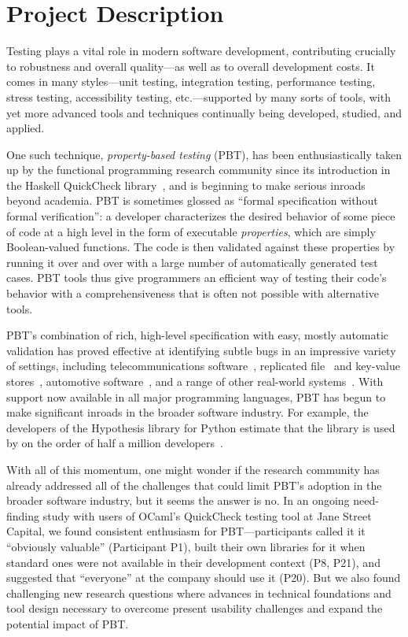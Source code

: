 \section*{Project Description}

Testing plays a vital role in modern software development,
contributing crucially to robustness and overall quality---as well as
to overall development costs.
%
It comes in many styles---unit testing, integration testing,
performance testing, stress testing, accessibility testing,
etc.---supported by many sorts of tools, with yet more advanced tools
and techniques continually being developed, studied, and applied.

One such technique, {\em property-based testing} (PBT), has been
enthusiastically taken up by the functional programming research
community since its introduction in the Haskell QuickCheck
library~\cite{ClaessenHughes00}, and is beginning to make
serious inroads beyond academia.
%
PBT is sometimes glossed as ``formal specification without formal
verification'': a developer characterizes the desired behavior of
some piece of code at a high level in the form of executable {\em
  properties}, which are simply Boolean-valued functions. The code is
then validated against these properties by running it over and over
with a large number of automatically generated test cases.
%
PBT tools thus give programmers an efficient way of testing their
code's behavior with a comprehensiveness that is often not
possible with alternative tools.

PBT's combination of rich, high-level specification with easy, mostly
automatic validation has proved effective at identifying subtle
bugs in an impressive variety of settings, including telecommunications
software~\cite{arts2006testing}, replicated
file~\cite{hughes2014mysteries} and key-value
stores~\cite{Bornholt2021}, automotive software~\cite{arts2015testing}, and a range
of other real-world systems~\cite{hughes2016experiences}. With support
now available in all major programming languages, PBT has
begun to make significant inroads in the broader software
industry. For example, the developers of the Hypothesis library for
Python estimate that the library is used by on the order of half a million
developers~\cite{ZacPersonalCommunication}.

\newcommand{\participant}[1]{{P#1}}

With all of this momentum, one might wonder if the research community has
already
addressed all of the challenges that could limit PBT's adoption
in the broader software industry, but it
seems the answer is no.
In an ongoing need-finding study with users of OCaml's QuickCheck testing tool
at Jane Street Capital, we found
consistent enthusiasm for PBT---participants called it it
``obviously valuable'' (Participant \participant{1}),
built their own libraries for it when standard ones were not available in their
development context (\participant{8},
\participant{21}), and suggested that ``everyone'' at the company should use it
(\participant{20}). But we also found
challenging new research questions where advances in technical foundations and
tool design necessary to overcome present usability challenges and expand the
potential impact of PBT.

